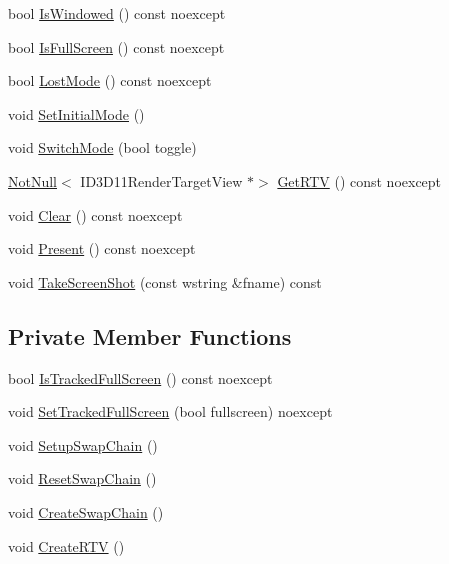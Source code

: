 \begin{DoxyCompactItemize}
\item 
bool \hyperlink{classmage_1_1rendering_1_1_swap_chain_1_1_impl_ac7216dc943fad37a078d1a9d18eb1491}{Is\+Windowed} () const noexcept
\item 
bool \hyperlink{classmage_1_1rendering_1_1_swap_chain_1_1_impl_abd74163f68b0a078f970d3d54d1dcd7e}{Is\+Full\+Screen} () const noexcept
\item 
bool \hyperlink{classmage_1_1rendering_1_1_swap_chain_1_1_impl_ad24213091dd95a649f293fb3b3607c34}{Lost\+Mode} () const noexcept
\item 
void \hyperlink{classmage_1_1rendering_1_1_swap_chain_1_1_impl_a910fab71dd7977005e11179080b25f14}{Set\+Initial\+Mode} ()
\item 
void \hyperlink{classmage_1_1rendering_1_1_swap_chain_1_1_impl_aa3c391f6651074e73105174b68025731}{Switch\+Mode} (bool toggle)
\item 
\hyperlink{namespacemage_a8769f9d670d6b585ea306cb1062af94b}{Not\+Null}$<$ I\+D3\+D11\+Render\+Target\+View $\ast$$>$ \hyperlink{classmage_1_1rendering_1_1_swap_chain_1_1_impl_a8c21e6075e67d434701fb63933bc114a}{Get\+R\+TV} () const noexcept
\item 
void \hyperlink{classmage_1_1rendering_1_1_swap_chain_1_1_impl_ab48d24a25bd342f6a3882426e333a716}{Clear} () const noexcept
\item 
void \hyperlink{classmage_1_1rendering_1_1_swap_chain_1_1_impl_ae75839c2c767280d4c7e8ee009fedfe0}{Present} () const noexcept
\item 
void \hyperlink{classmage_1_1rendering_1_1_swap_chain_1_1_impl_abdc55ba548c3178ab3edbeeb39099a4c}{Take\+Screen\+Shot} (const wstring \&fname) const
\end{DoxyCompactItemize}
\subsection*{Private Member Functions}
\begin{DoxyCompactItemize}
\item 
bool \hyperlink{classmage_1_1rendering_1_1_swap_chain_1_1_impl_a47dd7e6a9a21395fc4d79dfda3d9cd61}{Is\+Tracked\+Full\+Screen} () const noexcept
\item 
void \hyperlink{classmage_1_1rendering_1_1_swap_chain_1_1_impl_a6f97179cc5e352a349ed943413d149e7}{Set\+Tracked\+Full\+Screen} (bool fullscreen) noexcept
\item 
void \hyperlink{classmage_1_1rendering_1_1_swap_chain_1_1_impl_a1e34fe9c72a24a0345a9ba317762863d}{Setup\+Swap\+Chain} ()
\item 
void \hyperlink{classmage_1_1rendering_1_1_swap_chain_1_1_impl_afbc1208702d9807bed1126caae22bda6}{Reset\+Swap\+Chain} ()
\item 
void \hyperlink{classmage_1_1rendering_1_1_swap_chain_1_1_impl_a990a602cf4639daa85210b4cbd1e525e}{Create\+Swap\+Chain} ()
\item 
void \hyperlink{classmage_1_1rendering_1_1_swap_chain_1_1_impl_a414e0c397b0c00a893b92845b6918ffc}{Create\+R\+TV} ()
\end{DoxyCompactItemize}
